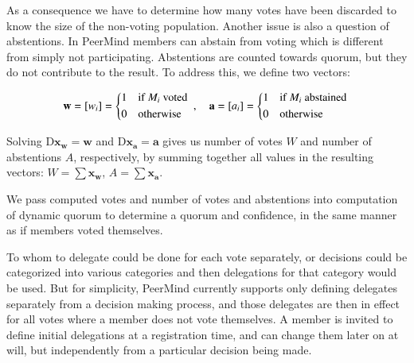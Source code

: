 \documentclass{sigchi}
\begin{document}

As a consequence we have to determine how many votes have been discarded to know the size of the non-voting
population.
Another issue is also a question of abstentions.
In PeerMind members can abstain from voting which is different from simply not participating.
Abstentions are counted towards quorum, but they do not contribute to the result.
To address this, we define two vectors:

\begin{displaymath}
\mathbf{w} = \left[w_{i}\right] = \begin{dcases*}
 1 & if $M_i$ voted \\
 0 & otherwise \\
\end{dcases*},\quad \mathbf{a} = \left[a_{i}\right] = \begin{dcases*}
 1 & if $M_i$ abstained \\
 0 & otherwise \\
\end{dcases*}
\end{displaymath}

Solving $\mathrm{D} \mathbf{x_w} = \mathbf{w}$ and $\mathrm{D} \mathbf{x_a} = \mathbf{a}$ gives
us number of votes $W$ and number of abstentions $A$, respectively, by summing together all values in the
resulting vectors: $W = \sum \mathbf{x_w}$, $A = \sum \mathbf{x_a}$.



We pass computed votes and number of votes and abstentions into computation of dynamic quorum to determine
a quorum and confidence, in the same manner as if members voted themselves.

To whom to delegate could be done for each vote separately, or decisions could be categorized into various
categories and then delegations for that category would be used.
But for simplicity, PeerMind currently supports only defining delegates separately from a decision making process,
and those delegates are then in effect for all votes where a member does not vote themselves.
A member is invited to define initial delegations at a registration time, and can change them later on at will,
but independently from a particular decision being made.
\end{document}
